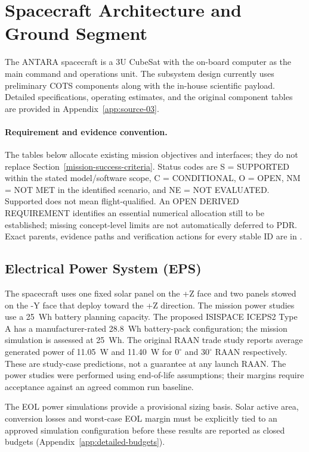 \section{Spacecraft Architecture and Ground Segment}\label{spacecraft-architecture}
The ANTARA spacecraft is a 3U CubeSat with the on-board computer as the main command and operations unit. The subsystem design currently uses preliminary COTS components along with the in-house scientific payload. Detailed specifications, operating estimates, and the original component tables are provided in Appendix~\ref{app:source-03}.

\paragraph{Requirement and evidence convention.} The tables below allocate existing mission objectives and interfaces; they do not replace Section~\ref{mission-success-criteria}. Status codes are S = SUPPORTED within the stated model/software scope, C = CONDITIONAL, O = OPEN, NM = NOT MET in the identified scenario, and NE = NOT EVALUATED. Supported does not mean flight-qualified. An OPEN DERIVED REQUIREMENT identifies an essential numerical allocation still to be established; missing concept-level limits are not automatically deferred to PDR. Exact parents, evidence paths and verification actions for every stable ID are in .

\subsection{Electrical Power System (EPS)}\label{electrical-power-system-eps}
The spacecraft uses one fixed solar panel on the +Z face and two panels stowed on the -Y face that deploy toward the +Z direction. The mission power studies use a 25~Wh battery planning capacity. The proposed ISISPACE ICEPS2 Type A has a manufacturer-rated 28.8~Wh battery-pack configuration; the mission simulation is assessed at 25~Wh. The original RAAN trade study reports average generated power of 11.05~W and 11.40~W for $0^\circ$ and $30^\circ$ RAAN respectively. These are study-case predictions, not a guarantee at any launch RAAN. The power studies were performed using end-of-life assumptions; their margins require acceptance against an agreed common run baseline.

The EOL power simulations provide a provisional sizing basis. Solar active area, conversion losses and worst-case EOL margin must be explicitly tied to an approved simulation configuration before these results are reported as closed budgets (Appendix~\ref{app:detailed-budgets}).

